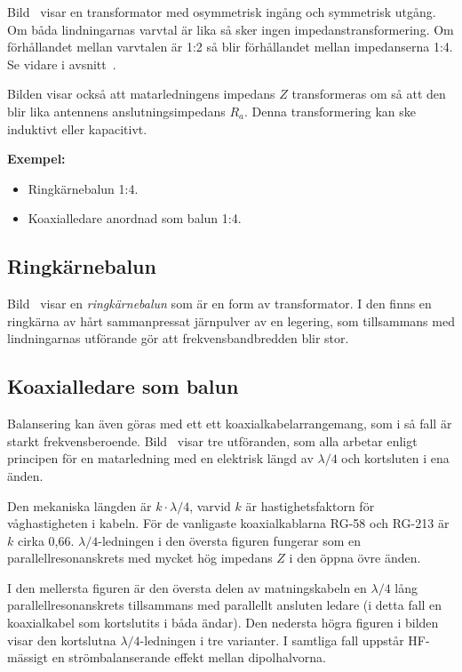 Bild~ visar en transformator med osymmetrisk ingång och
symmetrisk utgång.
Om båda lindningarnas varvtal är lika så sker ingen impedanstransformering.
Om förhållandet mellan varvtalen är 1:2 så blir förhållandet mellan
impedanserna 1:4.
Se vidare i avsnitt~.

Bilden visar också att matarledningens impedans \(Z\) transformeras om så
att den blir lika antennens anslutningsimpedans \(R_a\).
Denna transformering kan ske induktivt eller kapacitivt.

\noindent\textbf{Exempel:}
\begin{itemize}
\item Ringkärnebalun 1:4.
\item Koaxialledare anordnad som balun 1:4.
\end{itemize}

\subsection{Ringkärnebalun}

Bild~ visar en \emph{ringkärnebalun} som är en form av
transformator.
I den finns en ringkärna av hårt sammanpressat järnpulver av en legering, som
tillsammans med lindningarnas utförande gör att frekvensbandbredden blir stor.


\subsection{Koaxialledare som balun}

Balansering kan även göras med ett ett koaxialkabelarrangemang, som i
så fall är starkt frekvensberoende.
Bild~ visar tre utföranden, som alla arbetar enligt
principen för en matarledning med en elektrisk längd av \(\lambda/4\) och
kortsluten i ena änden.

Den mekaniska längden är \(k\cdot\lambda/4\), varvid \(k\) är hastighetsfaktorn
för våghastigheten i kabeln.
För de vanligaste koaxialkablarna RG-58 och RG-213 är \(k\) cirka 0,66.
\(\lambda/4\)-ledningen i den översta figuren fungerar som en
parallellresonanskrets med mycket hög impedans \(Z\) i den öppna övre änden.

I den mellersta figuren är den översta delen av matningskabeln en
\(\lambda/4\) lång parallellresonanskrets tillsammans med parallellt
ansluten ledare (i detta fall en koaxialkabel som kortslutits i båda ändar).
Den nedersta högra figuren i bilden visar den kortslutna
\(\lambda/4\)-ledningen i tre varianter.
I samtliga fall uppstår HF-mässigt en strömbalanserande effekt mellan
dipolhalvorna.

